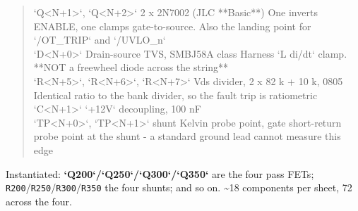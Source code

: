 \documentclass[11pt,a4paper]{article}
\begin{document}
\begin{quote}
\textbar{} `Q\textless{}N+1\textgreater{}`, `Q\textless{}N+2\textgreater{}` \textbar{} 2 x 2N7002 (JLC {*}{*}Basic{*}{*}) \textbar{} One inverts ENABLE, one clamps gate-to-source. Also the landing point for `/OT\_TRIP` and `/UVLO\_n` \textbar{}\\
\textbar{} `D\textless{}N+0\textgreater{}` \textbar{} Drain-source TVS, SMBJ58A class \textbar{} Harness `L di/dt` clamp. {*}{*}NOT a freewheel diode across the string{*}{*} \textbar{}\\
\textbar{} `R\textless{}N+5\textgreater{}`, `R\textless{}N+6\textgreater{}`, `R\textless{}N+7\textgreater{}` \textbar{} Vds divider, 2 x 82 k + 10 k, 0805 \textbar{} Identical ratio to the bank divider, so the fault trip is ratiometric \textbar{}\\
\textbar{} `C\textless{}N+1\textgreater{}` \textbar{} `+12V` decoupling, 100 nF \textbar{} \textbar{}\\
\textbar{} `TP\textless{}N+0\textgreater{}`, `TP\textless{}N+1\textgreater{}` \textbar{} shunt Kelvin probe point, gate \textbar{} short-return probe point at the shunt - a standard ground lead cannot measure this edge \textbar{}
\end{quote}
Instantiated: \textbf{`Q200`/`Q250`/`Q300`/`Q350`} are the four pass FETs; \texttt{R200}/\texttt{R250}/\texttt{R300}/\texttt{R350} the four shunts; and so on. \textasciitilde{}18 components per sheet, 72 across the four.
\end{document}

